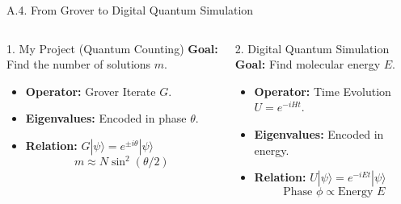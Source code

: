 \documentclass[aspectratio=169, 10pt]{beamer}
\begin{document}
\begin{frame}{A.4. From Grover to Digital Quantum Simulation}
    
    \begin{columns}[t]
        \begin{block}{1. My Project (Quantum Counting)}
            \textbf{Goal:} Find the number of solutions $m$.
            \vspace{0.2cm}
            \begin{itemize}
                \item \textbf{Operator:} Grover Iterate $G$.
                \item \textbf{Eigenvalues:} Encoded in phase $\theta$.
                \item \textbf{Relation:}
                $ G|\psi\rangle = e^{\pm i\theta}|\psi\rangle $
                $$ m \approx N \sin^2(\theta/2) $$
            \end{itemize}
        \end{block}

        \begin{alertblock}{2. Digital Quantum Simulation}
            \textbf{Goal:} Find molecular energy $E$.
            \vspace{0.2cm}
            \begin{itemize}
                \item \textbf{Operator:} Time Evolution $U = e^{-iHt}$.
                \item \textbf{Eigenvalues:} Encoded in energy.
                \item \textbf{Relation:}
                $ U|\psi\rangle = e^{-iEt}|\psi\rangle $
                $$ \text{Phase } \phi \propto \text{Energy } E $$
            \end{itemize}
        \end{alertblock}
    \end{columns}

    \vspace{0.1cm}

    \centering

\end{frame}
\end{document}
